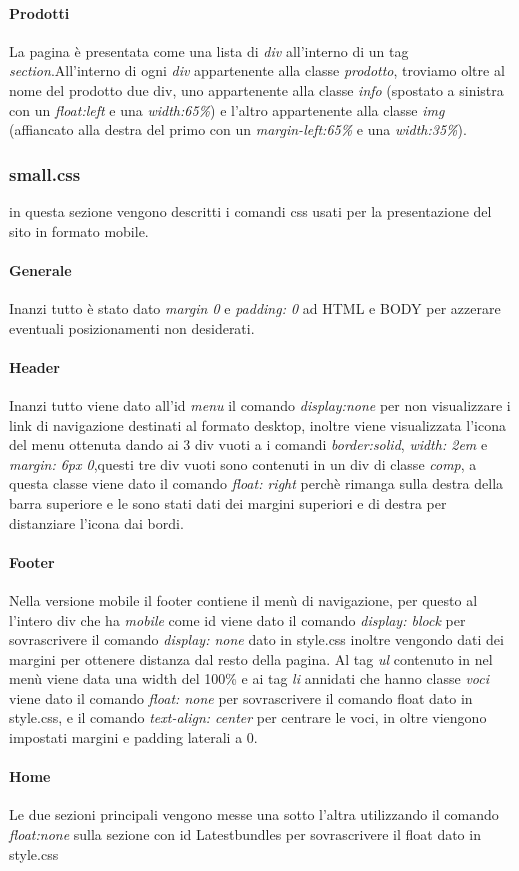 \paragraph{Prodotti} \mbox{}
La pagina è presentata come una lista di \emph{div} all'interno di un tag \emph{section}.\newline All'interno di ogni \emph{div} appartenente alla classe \emph{prodotto}, troviamo oltre al nome del prodotto due div, uno appartenente alla classe \emph{info} (spostato a sinistra con un \emph{float:left} e una \emph{width:65\%}) e l'altro appartenente alla classe \emph{img} (affiancato alla destra del primo con un \emph{margin-left:65\%} e una \emph{width:35\%}). 


\subsubsection{small.css}
in questa sezione vengono descritti i comandi css usati per la presentazione del sito in formato mobile.

\paragraph{Generale} \mbox{}
Inanzi tutto è stato dato \emph{margin 0} e \emph{padding: 0} ad HTML e BODY per azzerare eventuali posizionamenti non desiderati. 

\paragraph{Header} \mbox{}
Inanzi tutto viene dato all'id \emph{menu} il comando \emph{display:none} per non visualizzare i link di navigazione destinati al formato desktop, inoltre viene visualizzata l'icona del menu ottenuta dando ai 3 div vuoti a i comandi \emph{border:solid}, \emph{width: 2em} e \emph{margin: 6px 0},questi tre div vuoti sono contenuti in un div di classe \emph{comp}, a questa classe viene dato il comando \emph{float: right} perchè rimanga sulla destra della barra superiore e le sono stati dati dei margini superiori e di destra per distanziare l'icona dai bordi.

\paragraph{Footer} \mbox{}
Nella versione mobile il footer contiene il menù di navigazione, per questo al l'intero div che ha \emph{mobile} come id viene dato il comando \emph{display: block} per sovrascrivere il comando \emph{display: none} dato in style.css inoltre vengondo dati dei margini per ottenere distanza dal resto della pagina.
Al tag \emph{ul} contenuto in nel menù viene data una width del 100\% e ai tag \emph{li} annidati che hanno classe \emph{voci} viene dato il comando \emph{float: none} per sovrascrivere il comando float dato in style.css, e il comando \emph{text-align: center} per centrare le voci, in oltre viengono impostati margini e padding laterali a 0.

\paragraph{Home} \mbox{}
Le due sezioni principali vengono messe una sotto l'altra utilizzando il comando \emph{float:none} sulla sezione con id Latestbundles per sovrascrivere il float dato in style.css


